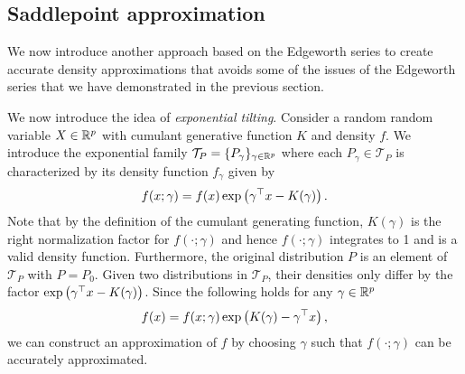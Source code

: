 \subsection{Saddlepoint approximation}

We now introduce another approach based on the Edgeworth series to create accurate density approximations that avoids some of the issues of the Edgeworth series that we have demonstrated in the previous section.

We now introduce the idea of \textit{exponential tilting}. Consider a random random variable $X \in {\mathbb{R}^p}$ with cumulant generative function $K$ and density $f$. We introduce the exponential family $\mathcal{T}_P = \{ P_\gamma \}_{\gamma \in {\mathbb{R}^p}}$ where each $P_\gamma \in \mathcal{T}_P$ is characterized by its density function $f_\gamma$ given by
\begin{equation*}
    f(x; \gamma) = f(x)\exp\left(\gamma^\top x - K(\gamma)\right).
\end{equation*}
Note that by the definition of the cumulant generating function, $K(\gamma)$ is the right normalization factor for $f(\cdot; \gamma)$ and hence $f(\cdot; \gamma)$ integrates to 1 and is a valid density function. Furthermore, the original distribution $P$ is an element of $\mathcal{T}_P$ with $P = P_0$. Given two distributions in $\mathcal{T}_P$, their densities only differ by the factor $\exp\left(\gamma^\top x - K(\gamma)\right)$. Since the following holds for any $\gamma \in {\mathbb{R}^p}$
\begin{equation} \label{eq-saddlepoint-original}
    f(x) = f(x; \gamma)\exp\left(K(\gamma) - \gamma^\top x\right),
\end{equation}
we can construct an approximation of $f$ by choosing $\gamma$ such that $f(\cdot; \gamma)$ can be accurately approximated.

